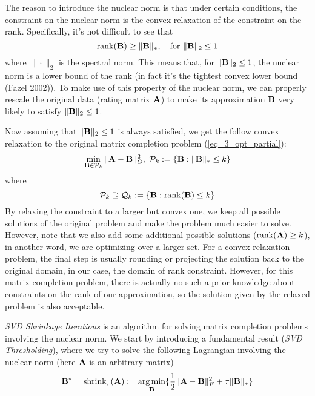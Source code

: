 \documentclass[../main.tex]{subfiles}
\begin{document}
The reason to introduce the nuclear norm is that under certain conditions, the constraint on the nuclear norm is the convex relaxation of the constraint on the rank. Specifically, it's not difficult to see that
\begin{equation*}
{\rm rank}({\bf B})\geq \|{\bf B}\|_*,\quad \text{for }\|{\bf B}\|_2\leq 1
\end{equation*}
where $\|\cdot\|_2$ is the spectral norm. This means that, for $\|{\bf B}\|_2\leq 1$, the nuclear norm is a lower bound of the rank (in fact it's the tightest convex lower bound (Fazel 2002)). To make use of this property of the nuclear norm, we can properly rescale the original data (rating matrix ${\bf A}$) to make its approximation ${\bf B}$ very likely to satisfy $\|{\bf B}\|_2\leq 1$.
\par Now assuming that $\|{\bf B}\|_2\leq 1$ is always satisfied, we get the follow convex relaxation to the original matrix completion problem (\ref{eq_3_opt_partial}):
\begin{equation*}
\min_{{\bf B}\in \mathcal{P}_k}\|{\bf A}-{\bf B}\|^2_G,\ \mathcal{P}_k:=\{{\bf B}:\|{\bf B}\|_*\leq k\}
\end{equation*}
where
\begin{equation*}
\mathcal{P}_k\supseteq \mathcal{Q}_k:=\{{\bf B}:{\rm rank}({\bf B})\leq k\}
\end{equation*}
By relaxing the constraint to a larger but convex one, we keep all possible solutions of the original problem and make the problem much easier to solve. However, note that we also add some additional possible solutions (${\rm rank}({\bf A})\geq k$), in another word, we are optimizing over a larger set. For a convex relaxation problem, the final step is usually rounding or projecting the solution back to the original domain, in our case, the domain of rank constraint. However, for this matrix completion problem, there is actually no such a prior knowledge about constraints on the rank of our approximation, so the solution given by the relaxed problem is also acceptable.
\par \emph{SVD Shrinkage Iterations} is an algorithm for solving matrix completion problems involving the nuclear norm. We start by introducing a fundamental result (\emph{SVD Thresholding}), where we try to solve the following Lagrangian involving the nuclear norm (here ${\bf A}$ is an arbitrary matrix)
\begin{equation}\label{eq_3_svdthres}
{\bf B}^*=\text{shrink}_{\tau}({\bf A}):=\mathop{\arg\min}_{{\bf B}}\{\frac{1}{2}\|{\bf A}-{\bf B}\|^2_F+\tau\|{\bf B}\|_*\}
\end{equation}
\end{document}
